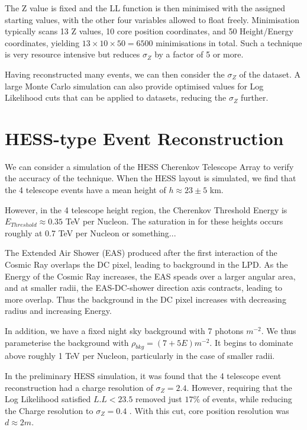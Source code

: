 \documentclass{article}
\begin{document}
The Z value is fixed and the LL function is then minimised with the assigned starting values, with the other four variables allowed to float freely. Minimisation typically scans 13 Z values, 10 core position coordinates, and 50 Height/Energy coordinates, yielding $ 13 \times 10 \times 50 = 6500$ minimisations in total. Such a technique is very resource intensive but reduces $\sigma_{Z}$ by a factor of 5 or more.

Having reconstructed many events, we can then consider the $\sigma_{Z}$ of the dataset. A large Monte Carlo simulation can also provide optimised values for Log Likelihood cuts that can be applied to datasets, reducing the $\sigma_{Z}$ further.

\section{HESS-type Event Reconstruction}
We can consider a simulation of the HESS Cherenkov Telescope Array to verify the accuracy of the technique. When the HESS layout is simulated, we find that the 4 telescope events have a mean height of $h \approx 23 \pm 5$ km.

However, in the 4 telescope height region, the Cherenkov Threshold Energy is $ E_{Threshold} \approx 0.35$ TeV per Nucleon. The saturation in for these heights occurs roughly at 0.7 TeV per Nucleon or something...

The Extended Air Shower (EAS) produced after the first interaction of the Cosmic Ray overlaps the DC pixel, leading to background in the LPD. As the Energy of the Cosmic Ray increases, the EAS speads over a larger angular area, and at smaller radii, the EAS-DC-shower direction axis contracts, leading to more overlap. Thus the background in the DC pixel increases with decreasing radius and increasing Energy. 

In addition, we have a fixed night sky background with 7 photons $m^{-2}$. We thus parameterise the background with 
$ \rho_{bkg}  = (7 + 5E) m^{-2}$. It begins to dominate above roughly 1 TeV per Nucleon, particularly in the case of smaller radii.

In the preliminary HESS simulation, it was found that the 4 telescope event reconstruction had a charge resolution of $\sigma_{Z} = 2.4$. However, requiring that the Log Likelihood satisfied $L.L < 23.5$ removed just $17 \%$ of events, while reducing the Charge resolution to $\sigma_{Z} = 0.4$ . With this cut, core position resolution was $d \approx 2 m $.
\end{document}
